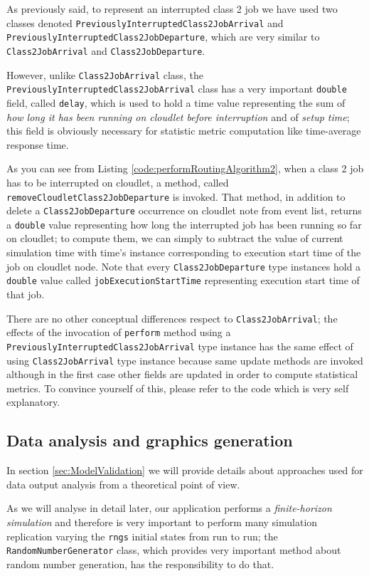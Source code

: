 \documentclass[10pt,a4paper]{article}
\begin{document}
As previously said, to represent an interrupted class 2 job we have used two classes denoted \texttt{PreviouslyInterruptedClass2JobArrival} and \texttt{PreviouslyInterruptedClass2JobDeparture}, which are very similar to \texttt{Class2JobArrival} and  \texttt{Class2JobDeparture}. 

However, unlike \texttt{Class2JobArrival} class, the \texttt{PreviouslyInterruptedClass2JobArrival} class has a very important \texttt{double} field, called \texttt{delay}, which is used to hold a time value representing the sum of \textit{how long it has been running on cloudlet before interruption} and of \textit{setup time}; this field is obviously necessary for statistic metric computation like time-average response time.

As you can see from Listing \ref{code:performRoutingAlgorithm2}, when a class 2 job has to be interrupted on cloudlet, a method, called \texttt{removeCloudletClass2JobDeparture} is invoked. That method, in addition to delete a \texttt{Class2JobDeparture} occurrence on cloudlet note from event list, returns a \texttt{double} value representing how long the interrupted job has been running so far on cloudlet; to compute them, we can simply to subtract the value of current simulation time with time's instance corresponding to execution start time of the job on cloudlet node. Note that every \texttt{Class2JobDeparture} type instances hold a \texttt{double} value called \texttt{jobExecutionStartTime} representing execution start time of that job.

There are no other conceptual differences respect to \texttt{Class2JobArrival}; the effects of the invocation of \texttt{perform} method using a \texttt{PreviouslyInterruptedClass2JobArrival} type instance has the same effect of using \texttt{Class2JobArrival} type instance because same update methods are invoked although in the first case other fields are updated in order to compute statistical metrics. To convince yourself of this, please refer to the code which is very self explanatory. 

\subsection{Data analysis and graphics generation}

In section \ref{sec:ModelValidation} we will provide details about approaches used for data output analysis from a theoretical point of view. 

As we will analyse in detail later, our application performs a \textit{finite-horizon simulation} and therefore is very important to perform many simulation replication varying the \texttt{rngs} initial states from run to run; the  
\texttt{RandomNumberGenerator} class, which provides very important method about random number generation, has the responsibility to do that.
\end{document}
